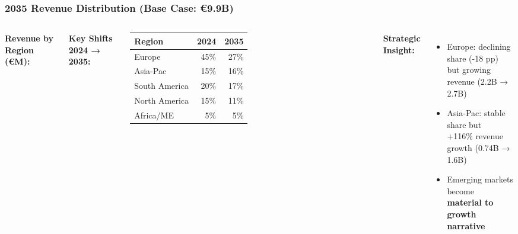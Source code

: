 \documentclass[aspectratio=169,12pt,xcolor=dvipsnames]{beamer}
\newcommand{\highlight}[1]{{\color{alpla_blue}\textbf{#1}}}
\begin{document}
\begin{frame}
  \frametitle{2035 Revenue Distribution (Base Case: €9.9B)}

  \begin{columns}[T]
    \centering

    \textbf{Revenue by Region (€M):}

    \vspace{0.3cm}


    \textbf{Key Shifts 2024 → 2035:}

    \vspace{0.3cm}

    \begin{tabular}{lrr}
      \toprule
      Region & 2024 & 2035 \\
      \midrule
      Europe & 45\% & 27\% \\
      Asia-Pac & 15\% & 16\% \\
      South America & 20\% & 17\% \\
      North America & 15\% & 11\% \\
      Africa/ME & 5\% & 5\% \\
      \bottomrule
    \end{tabular}

    \vspace{0.8cm}

    \textbf{Strategic Insight:}
    \begin{itemize}
      \item Europe: declining share (-18 pp) \\
        but growing revenue (2.2B → 2.7B)
      \item Asia-Pac: stable share but \\
        +116\% revenue growth (0.74B → 1.6B)
      \item Emerging markets become \\
        \highlight{material to growth narrative}
    \end{itemize}
  \end{columns}

\end{frame}
\end{document}
